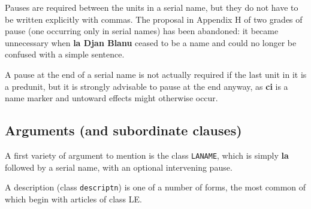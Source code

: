 \documentclass[12pt]{book}
\begin{document}
Pauses are required between the units in a serial name, but they do not have to be written explicitly with commas.  The proposal in Appendix H of two grades of pause
(one occurring only in serial names) has been abandoned:  it became unnecessary when {\bf la Djan Blanu} ceased to be a name and could no longer be confused with a simple sentence.

A pause at the end of a serial name is not actually required if the last unit in it is a predunit, but it is strongly advisable to pause at the end anyway, as {\bf ci} is a name marker and untoward effects might otherwise occur.

\subsection{Arguments (and subordinate clauses)}

A first variety of argument to mention is the class {\tt LANAME}, which is simply {\bf la} followed by a serial name, with an optional intervening pause.

A description  (class {\tt descriptn}) is one of a number of forms, the most common of which begin with articles of class LE.
\end{document}
